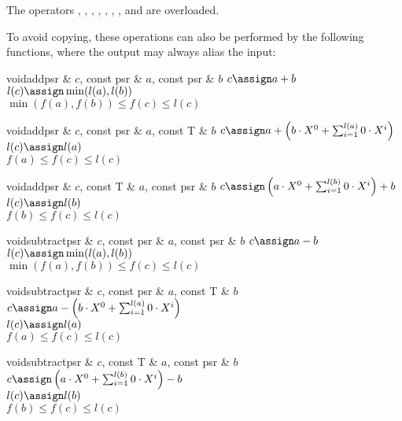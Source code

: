 \ARTH

The operators \code{+}, \code{+=}, \code{-}, \code{-=}, \code{*}, \code{*=}, \code{/}, and
\code{/=} are overloaded.

To avoid copying, these operations can also be performed by the following functions, where the
output may always alias the input:

\begin{fcode}{void}{add}{psr & $c$, const psr & $a$, const psr & $b$}
  $c \assign a + b$ \\
  $l(c) \assign \min(l(a),l(b))$ \\
  $\min(f(a),f(b)) \leq f(c) \leq l(c)$
\end{fcode}

\begin{fcode}{void}{add}{psr & $c$, const psr & $a$, const T & $b$}
  $c \assign a + \left( b \cdot X^0 + \sum_{i=1}^{l(a)} 0 \cdot X^i \right)$ \\
  $l(c) \assign l(a)$ \\
  $f(a) \leq f(c) \leq l(c)$
\end{fcode}

\begin{fcode}{void}{add}{psr & $c$, const T & $a$, const psr & $b$}
  $c \assign \left( a \cdot X^0 + \sum_{i=1}^{l(b)} 0 \cdot X^i \right) + b$ \\
  $l(c) \assign l(b)$ \\
  $f(b) \leq f(c) \leq l(c)$
\end{fcode}

\begin{fcode}{void}{subtract}{psr & $c$, const psr & $a$, const psr & $b$}
  $c \assign a - b$ \\
  $l(c) \assign \min(l(a),l(b))$ \\
  $\min(f(a),f(b)) \leq f(c) \leq l(c)$
\end{fcode}

\begin{fcode}{void}{subtract}{psr & $c$, const psr & $a$, const T & $b$}
  $c \assign a - \left( b \cdot X^0 + \sum_{i=1}^{l(a)} 0 \cdot X^i \right)$ \\
  $l(c) \assign l(a)$ \\
  $f(a) \leq f(c) \leq l(c)$
\end{fcode}

\begin{fcode}{void}{subtract}{psr & $c$, const T & $a$, const psr & $b$}
  $c \assign \left( a \cdot X^0 + \sum_{i=1}^{l(b)} 0 \cdot X^i \right) - b$ \\
  $l(c) \assign l(b)$ \\
  $f(b) \leq f(c) \leq l(c)$
\end{fcode}

